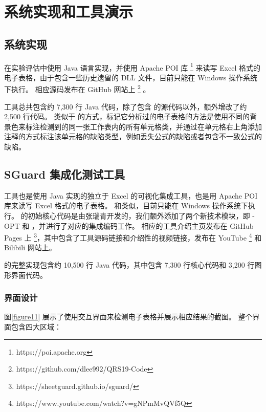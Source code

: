 \chapter{系统实现和工具演示}

\section{\wa 系统实现}

\wa 在实验评估中使用 Java 语言实现，并使用 Apache POI 库 \footnote{https://poi.apache.org} 来读写 Excel 格式的电子表格，由于包含一些历史遗留的 DLL 文件，目前只能在 Windows 操作系统下执行。
相应源码发布在 GitHub 网站上 \footnote{https://github.com/dlee992/QRS19-Code} 。

\wa 工具总共包含约 7,300 行 Java 代码，除了包含 \cu 的源代码以外，额外增改了约 2,500 行代码。
类似于 \cu 的方式，\wa 标记它分析过的电子表格的方法是使用不同的背景色来标注检测到的同一张工作表内的所有单元格类，并通过在单元格右上角添加注释的方式标注该单元格的缺陷类型，例如丢失公式的缺陷或者包含不一致公式的缺陷。

\section{SGuard 集成化测试工具}

\sg 工具也是使用 Java 实现的独立于 Excel 的可视化集成工具，也是用 Apache POI 库来读写 Excel 格式的电子表格。
和\wa 类似，目前只能在 Windows 操作系统下执行。
\sg 的初始核心代码是由张瑞青开发的，我们额外添加了两个新技术模块，即 \cu-OPT 和 \wa ，并进行了对应的集成编码工作。
相应的工具介绍主页发布在 GitHub Pages 上 \footnote{https://sheetguard.github.io/sguard/}，其中包含了工具源码链接和介绍性的视频链接，发布在 YouTube \footnote{https://www.youtube.com/watch?v=gNPmMvQVf5Q} 和 Bilibili 网站上。

\sg 的完整实现包含约 10,500 行 Java 代码，其中包含 7,300 行核心代码和 3,200 行图形界面代码。

\subsection{界面设计}



图\ref{figure11} 展示了\sg 使用交互界面来检测电子表格并展示相应结果的截图。
整个界面包含四大区域：

